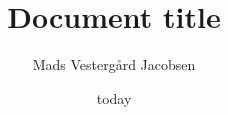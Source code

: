 

\title{Document title}
\author{Mads Vesterg\aa rd Jacobsen}
\date{today}



\maketitle







\backmatter %


